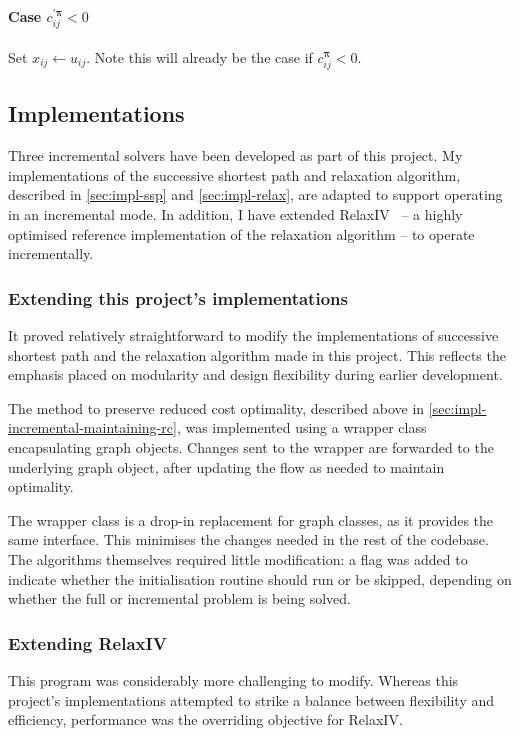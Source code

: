 \paragraph{Case $c_{ij}^{\prime\boldsymbol{\pi}} < 0$}
Set $x_{ij} \gets u_{ij}$. Note this will already be the case if $c_{ij}^{\boldsymbol{\pi}} < 0$.

\subsection{Implementations} \label{sec:impl-incremental-impl}

Three incremental solvers have been developed as part of this project. My implementations of the successive shortest path and relaxation algorithm, described in \cref{sec:impl-ssp} and \cref{sec:impl-relax}, are adapted to support operating in an incremental mode. In addition, I have extended RelaxIV~\cite{BertsekasCodes:1988,RelaxIV:2011} -- a highly optimised reference implementation of the relaxation algorithm -- to operate incrementally.

\subsubsection{Extending this project's implementations}
It proved relatively straightforward to modify the implementations of successive shortest path and the relaxation algorithm made in this project. This reflects the emphasis placed on modularity and design flexibility during earlier development.

The method to preserve reduced cost optimality, described above in \cref{sec:impl-incremental-maintaining-rc}, was implemented using a wrapper class encapsulating graph objects. Changes sent to the wrapper are forwarded to the underlying graph object, after updating the flow as needed to maintain optimality. 

The wrapper class is a drop-in replacement for graph classes, as it provides the same interface. This minimises the changes needed in the rest of the codebase. The algorithms themselves required little modification: a flag was added to indicate whether the initialisation routine should run or be skipped, depending on whether the full or incremental problem is being solved.
 
\subsubsection{Extending RelaxIV}
This program was considerably more challenging to modify. Whereas this project's implementations attempted to strike a balance between flexibility and efficiency, performance was the overriding objective for RelaxIV.

